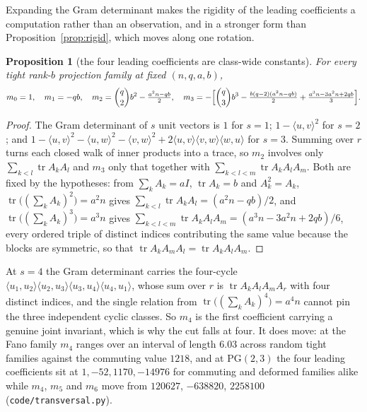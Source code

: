 \documentclass[11pt]{article}
\newtheorem{proposition}[theorem]{Proposition}
\theoremstyle{remark}
\begin{document}
Expanding the Gram determinant makes the rigidity of the leading coefficients a computation rather
than an observation, and in a stronger form than Proposition~\ref{prop:rigid}, which moves along one
rotation.

\begin{proposition}[the four leading coefficients are class-wide constants]\label{prop:leadrigid}
For every tight rank-$b$ projection family at fixed $(n,q,a,b)$,
\[
m_0=1,\quad m_1=-qb,\quad m_2=\binom q2b^2-\tfrac{a^2n-qb}2,\quad
m_3=-\Bigl[\binom q3b^3-\tfrac{b(q-2)(a^2n-qb)}2+\tfrac{a^3n-3a^2n+2qb}3\Bigr].
\]
\end{proposition}

\begin{proof}
The Gram determinant of $s$ unit vectors is $1$ for $s=1$; $1-\langle u,v\rangle^2$ for $s=2$; and
$1-\langle u,v\rangle^2-\langle u,w\rangle^2-\langle v,w\rangle^2
+2\langle u,v\rangle\langle v,w\rangle\langle w,u\rangle$ for $s=3$. Summing over $r$ turns each
closed walk of inner products into a trace, so $m_2$ involves only $\sum_{k<l}\operatorname{tr}A_kA_l$
and $m_3$ only that together with $\sum_{k<l<m}\operatorname{tr}A_kA_lA_m$. Both are fixed by the
hypotheses: from $\sum_kA_k=aI$, $\operatorname{tr}A_k=b$ and $A_k^2=A_k$,
$\operatorname{tr}\bigl((\sum_kA_k)^2\bigr)=a^2n$ gives $\sum_{k<l}\operatorname{tr}A_kA_l
=(a^2n-qb)/2$, and $\operatorname{tr}\bigl((\sum_kA_k)^3\bigr)=a^3n$ gives
$\sum_{k<l<m}\operatorname{tr}A_kA_lA_m=(a^3n-3a^2n+2qb)/6$, every ordered triple of distinct indices
contributing the same value because the blocks are symmetric, so that
$\operatorname{tr}A_kA_mA_l=\operatorname{tr}A_kA_lA_m$.
\end{proof}

At $s=4$ the Gram determinant carries the four-cycle
$\langle u_1,u_2\rangle\langle u_2,u_3\rangle\langle u_3,u_4\rangle\langle u_4,u_1\rangle$, whose sum
over $r$ is $\operatorname{tr}A_kA_lA_mA_r$ with four distinct indices, and the single relation from
$\operatorname{tr}\bigl((\sum_kA_k)^4\bigr)=a^4n$ cannot pin the three independent cyclic classes. So
$m_4$ is the first coefficient carrying a genuine joint invariant, which is why the cut falls at four.
It does move: at the Fano family $m_4$ ranges over an interval of length $6.03$ across random tight
families against the commuting value $1218$, and at $\mathrm{PG}(2,3)$ the four leading coefficients
sit at $1,-52,1170,-14976$ for commuting and deformed families alike while $m_4$, $m_5$ and $m_6$
move from $120627$, $-638820$, $2258100$ (\texttt{code/transversal.py}).
\end{document}
